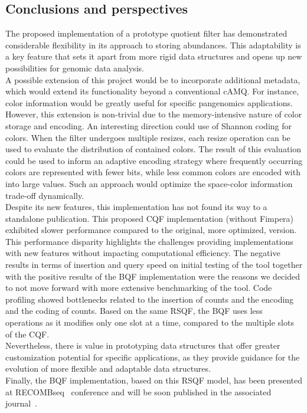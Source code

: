 \subsection{Conclusions and perspectives}
The proposed implementation of a prototype quotient filter has demonstrated considerable flexibility in its approach to storing \kmer abundances. This adaptability is a key feature that sets it apart from more rigid data structures and opens up new possibilities for genomic data analysis.\\
A possible extension of this project would be to incorporate additional metadata, which would extend its functionality beyond a conventional cAMQ. For instance, color information would be greatly useful for specific pangenomics applications. However, this extension is non-trivial due to the memory-intensive nature of color storage and encoding. An interesting direction could use of Shannon coding for colors. When the filter undergoes multiple resizes, each resize operation can be used to evaluate the distribution of contained colors. The result of this evaluation could be used to inform an adaptive encoding strategy where frequently occurring colors are represented with fewer bits, while less common colors are encoded with into large values. Such an approach would optimize the space-color information trade-off dynamically.\\
Despite its new features, this implementation has not found its way to a standalone publication. This proposed CQF implementation (without Fimpera) exhibited slower performance compared to the original, more optimized, version. This performance disparity highlights the challenges providing implementations with new features without impacting computational efficiency. The negative results in terms of insertion and query speed on initial testing of the tool together with the positive results of the BQF implementation were the reasons we decided to not move forward with more extensive benchmarking of the tool. Code profiling showed bottlenecks related to the insertion of counts and the encoding and the coding of counts. Based on the same RSQF, the BQF uses less operations as it modifies only one slot at a time, compared to the multiple slots of the CQF.\\
Nevertheless, there is value in prototyping data structures that offer greater customization potential for specific applications, as they provide guidance for the evolution of more flexible and adaptable data structures.\\
Finally, the BQF implementation, based on this RSQF model, has been presented at RECOMBseq~\cite{recombseq} conference and will be soon published in the associated journal~\cite{bqf}.

